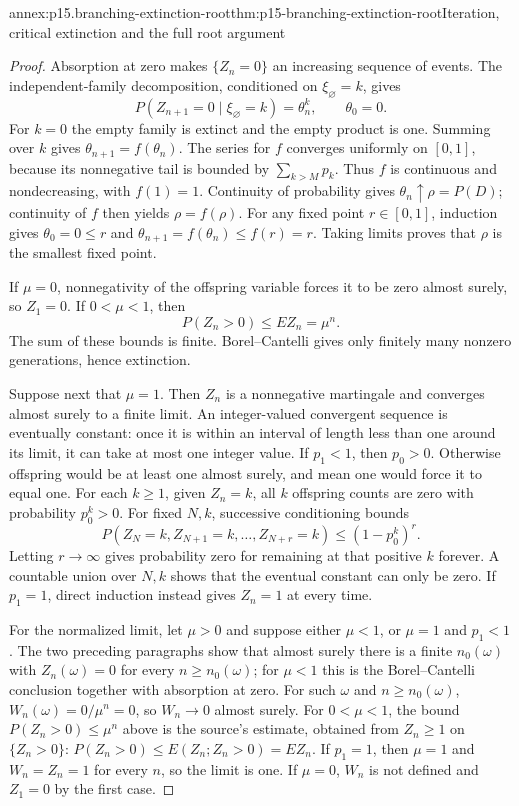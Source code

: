 \begin{annexitem}{annex:p15.branching-extinction-root}{thm:p15-branching-extinction-root}{Iteration, critical extinction and the full root argument}
\begin{proof}
Absorption at zero makes \(\{Z_n=0\}\) an increasing sequence of
events. The independent-family decomposition, conditioned on
\(\xi_\varnothing=k\), gives
\[
            P(Z_{n+1}=0\mid\xi_\varnothing=k)=\theta_n^k,
                         \qquad\theta_0=0.
\]
For \(k=0\) the empty family is extinct and the empty product is one.
Summing over \(k\) gives \(\theta_{n+1}=f(\theta_n)\).
The series for \(f\) converges uniformly on \([0,1]\), because
its nonnegative tail is bounded by \(\sum_{k>M}p_k\).
Thus \(f\) is continuous and nondecreasing, with \(f(1)=1\).
Continuity of probability gives \(\theta_n\uparrow\rho=P(D)\);
continuity of \(f\) then yields \(\rho=f(\rho)\).
For any fixed point \(r\in[0,1]\), induction gives
\(\theta_0=0\leq r\) and
\(\theta_{n+1}=f(\theta_n)\leq f(r)=r\).
Taking limits proves that \(\rho\) is the smallest fixed point.

If \(\mu=0\), nonnegativity of the offspring variable forces it
to be zero almost surely, so \(Z_1=0\).
If \(0<\mu<1\), then
\[
                            P(Z_n>0)\leq EZ_n=\mu^n.
\]
The sum of these bounds is finite. Borel--Cantelli gives only
finitely many nonzero generations, hence extinction.

Suppose next that \(\mu=1\).
Then \(Z_n\) is a nonnegative martingale and converges almost surely
to a finite limit. An integer-valued convergent sequence is
eventually constant: once it is within an interval of length
less than one around its limit, it can take at most one integer value.
If \(p_1<1\), then \(p_0>0\). Otherwise offspring would be at
least one almost surely, and mean one would force it to equal one.
For each \(k\geq1\), given \(Z_n=k\), all \(k\) offspring counts
are zero with probability \(p_0^k>0\).
For fixed \(N,k\), successive conditioning bounds
\[
 P(Z_N=k,Z_{N+1}=k,\ldots,Z_{N+r}=k)
                                 \leq(1-p_0^k)^r .
\]
Letting \(r\to\infty\) gives probability zero for remaining at
that positive \(k\) forever. A countable union over \(N,k\)
shows that the eventual constant can only be zero.
If \(p_1=1\), direct induction instead gives \(Z_n=1\) at every time.

For the normalized limit, let \(\mu>0\) and suppose either \(\mu<1\),
or \(\mu=1\) and \(p_1<1\). The two preceding paragraphs show that
almost surely there is a finite \(n_0(\omega)\) with \(Z_n(\omega)=0\)
for every \(n\geq n_0(\omega)\); for \(\mu<1\) this is the
Borel--Cantelli conclusion together with absorption at zero. For such
\(\omega\) and \(n\geq n_0(\omega)\), \(W_n(\omega)=0/\mu^n=0\), so
\(W_n\to0\) almost surely. For \(0<\mu<1\), the bound
\(P(Z_n>0)\leq\mu^n\) above is the source's estimate, obtained from
\(Z_n\geq1\) on \(\{Z_n>0\}\): \(P(Z_n>0)\leq E(Z_n;Z_n>0)=EZ_n\).
If \(p_1=1\), then \(\mu=1\) and \(W_n=Z_n=1\) for every \(n\), so the
limit is one. If \(\mu=0\), \(W_n\) is not defined and \(Z_1=0\) by the
first case.


\end{proof}
\end{annexitem}
